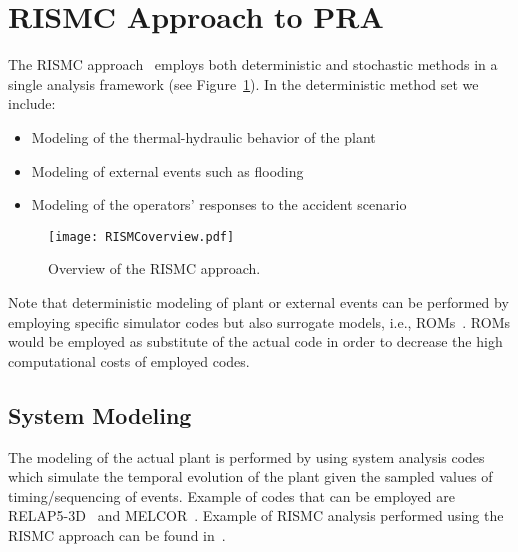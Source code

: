 \section{RISMC Approach to PRA}
\label{sec:rismc}
The RISMC approach~\cite{RISMC} employs both deterministic and stochastic methods 
in a single analysis framework (see Figure~\ref{fig:RISMCoverview}). In the deterministic method 
set we include:
\begin{itemize}
  \item Modeling of the thermal-hydraulic behavior of the plant~\cite{BWR_SBO_Mandelli,BWRanalysis}
  \item Modeling of external events such as flooding~\cite{mandelliPSA2015}
  \item Modeling of the operators’ responses to the accident scenario~\cite{HRA_BoringReport2014}
\end{itemize}

\begin{figure}
    \centering
    \centerline{\texttt{[image: RISMCoverview.pdf]}}
    \caption{Overview of the RISMC approach.}
    \label{fig:RISMCoverview}
\end{figure}

Note that deterministic modeling of plant or external events can be performed by employing 
specific simulator codes but also surrogate models, i.e., ROMs~\cite{ROM_Khalik}. 
ROMs would be employed as substitute of the actual code in order to decrease the high computational 
costs of employed codes.

\subsection{System Modeling}
The modeling of the actual plant is performed by using system analysis codes which simulate the temporal 
evolution of the plant given the sampled values of timing/sequencing of events. Example of codes 
that can be employed are RELAP5-3D~\cite{relap5} and MELCOR~\cite{Melcor}. 
Example of RISMC analysis performed using the RISMC approach can be 
found in~\cite{BWR_SBO_Mandelli,BWRanalysis,PRA_comparison_PSA2015}.

